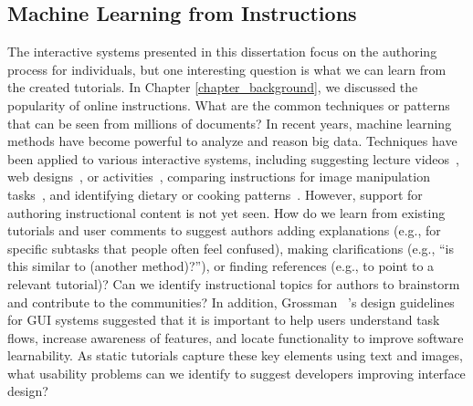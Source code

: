 \subsection{Machine Learning from Instructions}
The interactive systems presented in this dissertation focus on the authoring process for individuals, but one interesting question is what we can learn from the created tutorials. In Chapter \ref{chapter_background}, we discussed the popularity of online instructions. What are the common techniques or patterns that can be seen from millions of documents?
%
In recent years, machine learning methods have become powerful to analyze and reason big data. Techniques have been applied to various interactive systems, including suggesting lecture videos~\cite{Kim:2014:DIT:2642918.2647389}, web designs~\cite{Kumar:2013:WDM:2470654.2466420}, or activities~\cite{Fast:2016:AMH:2858036.2858528}, comparing instructions for image manipulation tasks~\cite{Pavel:EECS-2013-167}, and identifying dietary or cooking patterns~\cite{IBMChefWatson,West:2013:CCI:2488388.2488510}.
%
However, support for authoring instructional content is not yet seen. How do we learn from existing tutorials and user comments to suggest authors adding explanations (e.g., for specific subtasks that people often feel confused), making clarifications (e.g., ``is this similar to (another method)?''), or finding references (e.g., to point to a relevant tutorial)? Can we identify instructional topics for authors to brainstorm and contribute to the communities?
%
In addition, Grossman \ea{}~\cite{Grossman:2009:SSL:1518701.1518803}'s design guidelines for GUI systems suggested that it is important to help users understand task flows, increase awareness of features, and locate functionality to improve software learnability. As static tutorials capture these key elements using text and images, what usability problems can we identify to suggest developers improving interface design?

